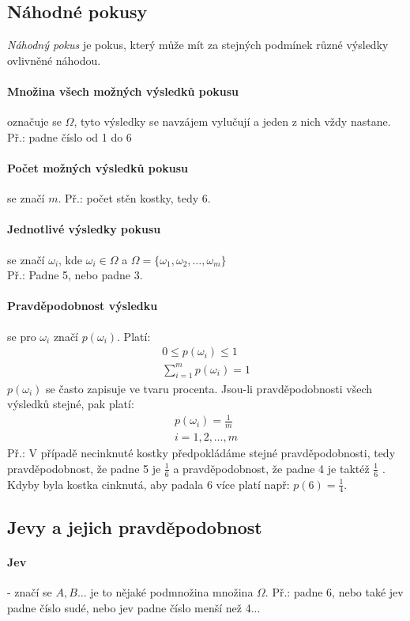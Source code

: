 \documentclass[12pt]{article}
\begin{document}
\subsection{Náhodné pokusy}
\emph{Náhodný pokus} je pokus, který může mít za stejných podmínek různé výsledky ovlivněné náhodou.\\
\paragraph{Množina všech možných výsledků pokusu} označuje se $\Omega$, tyto výsledky se navzájem vylučují a jeden z nich vždy nastane. Př.: padne číslo od 1 do 6
\paragraph{Počet možných výsledků pokusu} se značí $m$. Př.: počet stěn kostky, tedy 6.
\paragraph{Jednotlivé výsledky pokusu} se značí $\omega_i$, kde $\omega_i \in \Omega$ a $\Omega = \{ \omega_1, \omega_2, \dotsc, \omega_m \}$\\ Př.: Padne 5, nebo padne 3.
\paragraph{Pravděpodobnost výsledku} se pro $\omega_i$ značí $p(\omega_i)$. Platí:
\begin{align}
0 \leq p(\omega_i) \leq 1\\
\sum^m_{i=1}p(\omega_i) = 1
\end{align}
$p(\omega_i)$ se často zapisuje ve tvaru procenta. Jsou-li pravděpodobnosti všech výsledků stejné, pak platí:
\begin{align}
p\left(\omega_i\right) = \frac{1}{m}\\
i = 1,2, \dotsc, m
\end{align}
Př.: V případě necinknuté kostky předpokládáme stejné pravděpodobnosti, tedy pravděpodobnost, že padne 5 je $\frac{1}{6}$ a pravděpodobnost, že padne 4 je taktéž $\frac{1}{6}$ .\\ Kdyby byla kostka cinknutá, aby padala 6 více platí např: $p(6) = \frac{1}{4}$.

\subsection{Jevy a jejich pravděpodobnost}
\paragraph{Jev} - značí se $A,B \dotso$ je to nějaké podmnožina množina $\Omega$. Př.: padne 6, nebo také jev padne číslo sudé, nebo jev padne číslo menší než 4...
\end{document}
